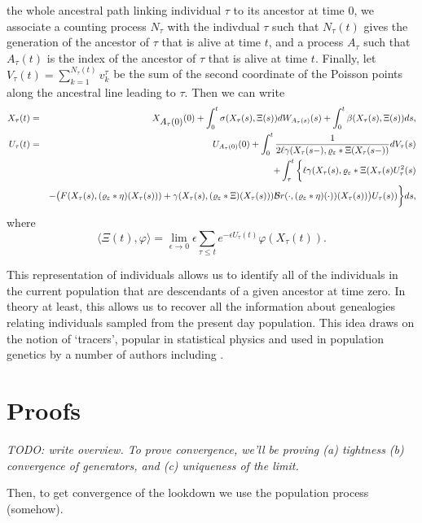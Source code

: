 \documentclass[12pt]{article}
\newcommand{\comment}[1]{{\color{blue} \it #1}}
\begin{document}
the whole ancestral path linking individual $\tau$ to its ancestor at 
time $0$, we associate a counting process $N_{\tau}$ with the indivdual
$\tau$    
such that $N_{\tau}(t)$ gives the generation of the ancestor of $\tau$ 
that is alive at time $t$,
and a process $A_{\tau}$ such that 
$A_{\tau}(t)$ is 
the index of the ancestor of $\tau$ that is alive at time $t$. 
Finally, let $V_{\tau}(t)=\sum_{k=1}^{N_{\tau}(t)}v_k^{\tau}$ be the sum of the second 
coordinate of the Poisson points along the ancestral line 
leading to $\tau$.  Then we can write 
\begin{eqnarray*}
X_{\tau}(t)&=&X_{\mbox{\rm $A_{\tau}(0)$}}(0)+\int_0^t\sigma 
(X_{\tau}(s),\Xi (s))dW_{A_{\tau}(s)}(s)+\int_0^t\beta (X_{\tau}
(s),\Xi (s))ds,\\
U_{\tau}(t)&=&U_{A_{\tau}(0)}(0)+\int_0^t\frac 1{2\ell \gamma(X_{\tau}(s-),\varrho_\varepsilon*\Xi(X_{\tau}(s-))}dV_{\tau}(s)\\
&&\qquad\qquad +\int_{\tau}^t\bigg\{\ell \gamma(X_{\tau}(s),\varrho_\varepsilon*\Xi(X_{\tau}(s)U_{\tau}^2(s) \\
&&-\big(F(X_{\tau}(s), (\varrho_{\varepsilon}*\eta)(X_{\tau}(s)))+\gamma(X_{\tau}(s), (\varrho_{\varepsilon}*\Xi)(X_{\tau}(s)))\mathcal{B}r(\cdot,(\varrho_{\varepsilon}*\eta)(\cdot))(X_{\tau}(s))\big)U_{\tau}(s))\bigg\}ds,\end{eqnarray*}
where
\[\langle\Xi (t),\varphi\rangle =\lim_{\epsilon\rightarrow 0}
\epsilon\sum_{
\tau\leq t}e^{-\epsilon U_{\tau}(t)}\varphi (X_{\tau}(t)).\]

This representation of individuals allows us to identify all 
of the individuals in the current population that are descendants of a
given ancestor at time zero. In theory at least, this allows us to
recover all the information about genealogies relating individuals 
sampled from the present day population. This idea draws on the notion
of `tracers', popular in statistical physics and used in population
genetics by a number of authors including 
\cite{biswas/etheridge/klimek:2018, durrett/fan:2016, hallatschek/nelson:2008}.





\section{Proofs}

\comment{
    TODO: write overview.
    To prove convergence, we'll be proving
    (a) tightness
    (b) convergence of generators, and
    (c) uniqueness of the limit.

    Then, to get convergence of the lookdown
    we use the population process (somehow).
}
\end{document}
